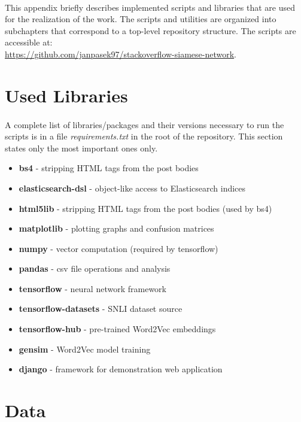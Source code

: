 \paragraph{}
This appendix briefly describes implemented scripts and libraries that are used for the realization of the work. The scripts and utilities are organized into subchapters that correspond to a top-level repository structure. The scripts are accessible at:\\ \url{https://github.com/janpasek97/stackoverflow-siamese-network}.

\section{Used Libraries}
\paragraph{}
A complete list of libraries/packages and their versions necessary to run the scripts is in a file \textit{requirements.txt} in the root of the repository. This section states only the most important ones only.

\begin{itemize}
	\item \textbf{bs4} - stripping HTML tags from the post bodies
	\item \textbf{elasticsearch-dsl} - object-like access to Elasticsearch indices
	\item \textbf{html5lib} - stripping HTML tags from the post bodies (used by bs4)
	\item \textbf{matplotlib} - plotting graphs and confusion matrices
	\item \textbf{numpy} - vector computation (required by tensorflow)
	\item \textbf{pandas} - csv file operations and analysis
	\item \textbf{tensorflow} - neural network framework
	\item \textbf{tensorflow-datasets} - SNLI dataset source
	\item \textbf{tensorflow-hub} - pre-trained Word2Vec embeddings
	\item \textbf{gensim} - Word2Vec model training 
	\item \textbf{django} - framework for demonstration web application
\end{itemize}

\section{Data}
